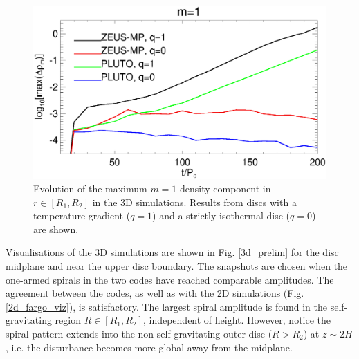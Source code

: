 \begin{figure}
  \includegraphics[width=\linewidth]{figures/m1_analysis_plot_ampmax3d}
  \caption{Evolution of the maximum $m=1$ density component in  $r\in[R_1,R_2]$
    in the 3D simulations. Results from discs with a 
    temperature gradient ($q=1$) and a strictly isothermal disc
    ($q=0$) are shown.  
    \label{3d_ampmax}}   
\end{figure}

Visualisations of the 3D simulations are shown in   
Fig. \ref{3d_prelim} for the disc midplane and near the upper disc
boundary. The snapshots are chosen when the one-armed spirals in the two codes
have reached comparable amplitudes. The agreement between the codes,
as well as with the 2D simulations (Fig. \ref{2d_fargo_viz}), is
satisfactory. The largest spiral amplitude is found in the
self-gravitating region $R\in[R_1,R_2]$, independent of
height. However, notice the spiral pattern extends into 
the non-self-gravitating outer disc ($R>R_2$) at $z\sim 2H$, i.e.    
the disturbance becomes more global away from the midplane. 

